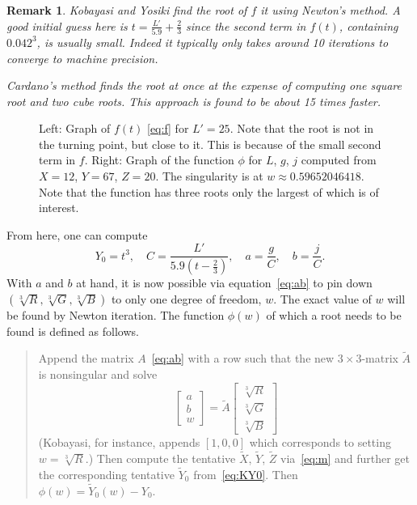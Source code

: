 \documentclass{scrartcl}
\newtheorem*{remark}{Remark}
\theoremstyle{named}
\begin{document}
\begin{remark}
  Kobayasi and Yosiki find the root of $f$ it using Newton's method.  A good initial
  guess here is $t = \frac{L'}{5.9} + \frac{2}{3}$ since the second term in $f(t)$,
  containing $0.042^3$, is usually small. Indeed it typically only takes around 10
  iterations to converge to machine precision.

  Cardano's method finds the root at once at the expense of computing one square root
  and two cube roots. This approach is found to be about 15 times faster.
\end{remark}


\begin{figure}
  \centering
  \hfill
  
  \hfill
  
  \hfill
  \caption{Left: Graph of $f(t)$ \eqref{eq:f} for $L'=25$. Note that the root is not in
  the turning point, but close to it. This is because of the small second term in $f$.
  Right: Graph of the function $\phi$ for $L$, $g$, $j$ computed from $X=12$, $Y=67$,
  $Z=20$. The singularity is at $w\approx 0.59652046418$.  Note that the function has
  three roots only the largest of which is of interest.}\label{fig:singularity}
\end{figure}

From here, one can compute
\begin{equation}\label{eq:gather}
  Y_0 = t^3,\quad
  C = \frac{L'}{5.9 \left(t - \frac{2}{3}\right)},\quad
  a = \frac{g}{C},\quad
  b = \frac{j}{C}.
\end{equation}
With $a$ and $b$ at hand, it is now possible via equation~\eqref{eq:ab} to pin down
$(\sqrt[3]{R}, \sqrt[3]{G}, \sqrt[3]{B})$ to only one degree of freedom, $w$.
The exact value of $w$ will be found by Newton iteration. The function $\phi(w)$
of which a root needs to be found is defined as follows.
\begin{quotation}
  Append the matrix $A$~\eqref{eq:ab} with a row such that the new $3\times3$-matrix
  $\tilde{A}$ is nonsingular and solve
  \[
    \begin{bmatrix}
      a\\
      b\\
      w
    \end{bmatrix}
    =
    \tilde{A}
    \begin{bmatrix}
      \sqrt[3]{R}\\
      \sqrt[3]{G}\\
      \sqrt[3]{B}
    \end{bmatrix}
  \]
  (Kobayasi, for instance, appends $[1, 0, 0]$ which corresponds to setting
  $w=\sqrt[3]{R}$.) Then compute the tentative $\tilde{X}$, $\tilde{Y}$, $\tilde{Z}$
  via~\eqref{eq:m} and further get the corresponding tentative $\tilde{Y}_0$
  from~\eqref{eq:KY0}. Then $\phi(w) = \tilde{Y}_0(w) - Y_0$.
\end{quotation}
\end{document}
